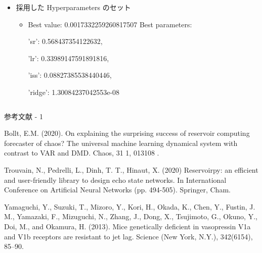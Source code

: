 \begin{frame}
\begin{columns}[T]
\begin{column}{.5\textwidth}
\begin{itemize}
\begin{itemize}
                    sr:  (1e-2, 10, log = True)

                    lr: (1e-3, 1, log = True)

                    iss: (0, 1)
                    
                    ridge: (1e-9, 1e-2, log = True)

                    \item 一様ランダムにサンプリング．
                    \item log = True で$\log$ をとって一様ランダムにサンプリング．
                \end{itemize}
                \item 採用した Hyperparameters のセット\begin{itemize}
                    \item Best value: 0.0017332259260817507
                    Best parameters: {
                        
                        'sr': 0.568437354122632, 
                        
                        'lr': 0.33989147591891816, 
                        
                        'iss': 0.08827385538440446, 
                        
                        'ridge': 1.30084237042553e-08}
                \end{itemize}
            \end{itemize}
        \end{column}
      \end{columns}
    
\end{frame}


\begin{frame}{参考文献 - 1}
    \begin{thebibliography}{99}    
        Bollt, E.M. (2020). On explaining the surprising success of reservoir computing forecaster of chaos? The universal machine learning dynamical system with contrast to VAR and DMD. Chaos, 31 1, 013108 .

        Trouvain, N., Pedrelli, L., Dinh, T. T., Hinaut, X. (2020) Reservoirpy: an efficient and user-friendly library to design echo state networks. In International Conference on Artificial Neural Networks (pp. 494-505). Springer, Cham.

        Yamaguchi, Y., Suzuki, T., Mizoro, Y., Kori, H., Okada, K., Chen, Y., Fustin, J. M., Yamazaki, F., Mizuguchi, N., Zhang, J., Dong, X., Tsujimoto, G., Okuno, Y., Doi, M., and Okamura, H. (2013). Mice genetically deficient in vasopressin V1a and V1b receptors are resistant to jet lag. Science (New York, N.Y.), 342(6154), 85–90. 
    \end{thebibliography}
\end{frame}

